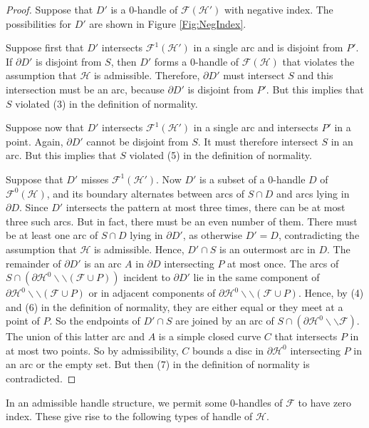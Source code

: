 \documentclass[oneside]{amsart}
\numberwithin{equation}{section}
\theoremstyle{plain}
\theoremstyle{definition}
\newcommand{\cut}{\backslash\backslash}
\newcommand{\calH}{\mathcal{H}}
\newcommand{\calF}{\mathcal{F}}
\begin{document}
\begin{proof}
Suppose that $D'$ is a 0-handle of $\mathcal{F}(\mathcal{H}')$ with negative index. The possibilities for $D'$ are shown in Figure \ref{Fig:NegIndex}. 

Suppose first that $D'$ intersects $\mathcal{F}^1(\mathcal{H}')$ in a single arc and is disjoint from $P'$. If $\partial D'$ is disjoint from $S$, then $D'$ forms a 0-handle of $\calF(\calH)$ that violates the assumption that $\calH$ is admissible. Therefore, $\partial D'$ must intersect $S$ and this intersection must be an arc, because $\partial D'$ is disjoint from $P'$. But this implies that $S$ violated (3) in the definition of normality. 

Suppose now that $D'$ intersects $\mathcal{F}^1(\mathcal{H}')$ in a single arc and intersects $P'$ in a point. Again, $\partial D'$ cannot be disjoint from $S$. It must therefore intersect $S$ in an arc. But this implies that $S$ violated (5) in the definition of normality.

Suppose that $D'$ misses $\mathcal{F}^1(\mathcal{H}')$. Now $D'$ is a subset of a 0-handle $D$ of $\mathcal{F}^0(\mathcal{H})$, and its boundary alternates between arcs of $S \cap D$ and arcs lying in $\partial D$. Since $D'$ intersects the pattern at most three times, there can be at most three such arcs. But in fact, there must be an even number of them. There must be at least one arc of $S \cap D$ lying in $\partial D'$, as otherwise $D' = D$, contradicting the assumption that $\mathcal{H}$ is admissible. Hence, $D' \cap S$ is an outermost arc in $D$. The remainder of $\partial D'$ is an arc $A$ in $\partial D$ intersecting $P$ at most once. The arcs of $S \cap (\partial \mathcal{H}^0 \cut (\mathcal{F} \cup P))$ incident to $\partial D'$ lie in the same component of $\partial \mathcal{H}^0 \cut (\mathcal{F} \cup P)$ or in adjacent components of $\partial \mathcal{H}^0 \cut (\mathcal{F} \cup P)$. Hence, by (4) and (6) in the definition of normality, they are either equal or they meet at a point of $P$. So the endpoints of $D' \cap S$ are joined by an arc of $S \cap (\partial \calH^0 \cut \calF)$. The union of this latter arc and $A$ is a simple closed curve $C$ that intersects $P$ in at most two points. So by admissibility, $C$ bounds a disc in $\partial \calH^0$ intersecting $P$ in an arc or the empty set. But then (7) in the definition of normality is contradicted.
\end{proof}

In an admissible handle structure, we permit some 0-handles of $\mathcal{F}$ to have zero index. These give rise to the following types of handle of $\mathcal{H}$.
\end{document}
